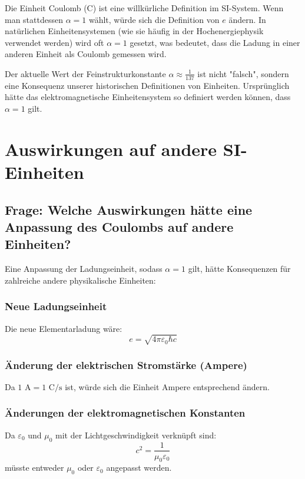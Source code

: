 \documentclass{article}
\begin{document}
	Die Einheit Coulomb (C) ist eine willkürliche Definition im SI-System. Wenn man stattdessen $\alpha = 1$ wählt, würde sich die Definition von $e$ ändern. In natürlichen Einheitensystemen (wie sie häufig in der Hochenergiephysik verwendet werden) wird oft $\alpha = 1$ gesetzt, was bedeutet, dass die Ladung in einer anderen Einheit als Coulomb gemessen wird.
	
	Der aktuelle Wert der Feinstrukturkonstante $\alpha \approx \frac{1}{137}$ ist nicht "falsch", sondern eine Konsequenz unserer historischen Definitionen von Einheiten. Ursprünglich hätte das elektromagnetische Einheitensystem so definiert werden können, dass $\alpha = 1$ gilt.
	
	\section{Auswirkungen auf andere SI-Einheiten}
	
	\subsection{Frage: Welche Auswirkungen hätte eine Anpassung des Coulombs auf andere Einheiten?}
	
	Eine Anpassung der Ladungseinheit, sodass $\alpha = 1$ gilt, hätte Konsequenzen für zahlreiche andere physikalische Einheiten:
	
	\subsubsection{Neue Ladungseinheit}
	Die neue Elementarladung wäre:
	\begin{equation}
		e = \sqrt{4\pi\varepsilon_0\hbar c}
	\end{equation}
	
	\subsubsection{Änderung der elektrischen Stromstärke (Ampere)}
	Da $1 \text{ A} = 1 \text{ C}/\text{s}$ ist, würde sich die Einheit Ampere entsprechend ändern.
	
	\subsubsection{Änderungen der elektromagnetischen Konstanten}
	Da $\varepsilon_0$ und $\mu_0$ mit der Lichtgeschwindigkeit verknüpft sind:
	\begin{equation}
		c^2 = \frac{1}{\mu_0\varepsilon_0}
	\end{equation}
	müsste entweder $\mu_0$ oder $\varepsilon_0$ angepasst werden.
	
\end{document}
